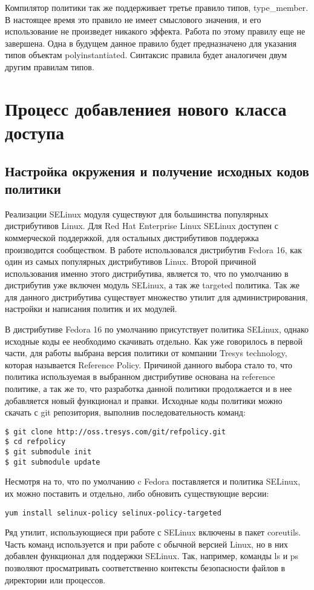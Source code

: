 \documentclass{./../class/UIR}
\begin{document}
    Компилятор политики так же поддерживает третье правило типов, type\_member.
    В настоящее время это правило не имеет смыслового значения, и его
    использование не произведет никакого эффекта. Работа по этому правилу еще не
    завершена. Одна в будущем данное правило будет предназначено для указания
    типов объектам polyinstantiated. Синтаксис правила будет аналогичен двум
    другим правилам типов.


\section{Процесс добавлениея нового класса доступа}
\subsection{Настройка окружения и получение исходных кодов политики}
	Реализации SELinux модуля существуют для большинства популярных дистрибутивов
	Linux. Для Red Hat Enterprise Linux SELinux доступен с коммерческой поддержкой,
	для остальных дистрибутивов поддержка производится сообществом. В работе
	использовался дистрибутив Fedora 16, как один из самых популярных дистрибутивов
	Linux. Второй причиной использования именно этого дистрибутива, является то,
	что по умолчанию в дистрибутив уже включен модуль SELinux, а так же targeted
	политика. Так же для данного дистрибутива существует множество утилит для
	администрирования, настройки и написания политик и их модулей.
	
	В дистрибутиве Fedora 16 по умолчанию присутствует политика SELinux, однако
	исходные коды ее необходимо скачивать отдельно. Как уже говорилось в первой
	части, для работы выбрана версия политики от компании Tresys technology,
	которая называется Reference Policy. Причиной данного выбора стало то, что
	политика используемая в выбранном дистрибутиве основана на reference политике,
	а так же то, что разработка данной политики продолжается и в нее добавляется
	новый функционал и правки. Исходные коды политики можно скачать с git
	репозитория, выполнив последовательность команд:
\begin{verbatim}
$ git clone http://oss.tresys.com/git/refpolicy.git
$ cd refpolicy
$ git submodule init
$ git submodule update
\end{verbatim}
	Несмотря на то, что по умолчанию c Fedora поставляется и политика SELinux, их
	можно поставить и отдельно, либо обновить существующие версии:
\begin{verbatim}
yum install selinux-policy selinux-policy-targeted
\end{verbatim}
	Ряд утилит, использующиеся при работе с SELinux включены в пакет coreutils.
	Часть команд используется и при работе с обычной версией Linux, но в них
	добавлен функционал для поддержки SELinux. Так, например, команды ls и ps
	позволяют просматривать соответственно контексты безопасности файлов в
	директории или процессов.
	
\end{document}
